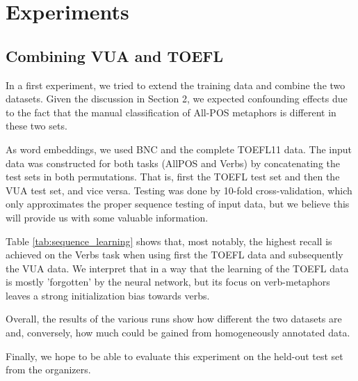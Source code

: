 \documentclass[11pt,a4paper]{article}
\begin{document}
\section{Experiments}

\subsection{Combining VUA and TOEFL}
In a first experiment, we tried to extend the training data and combine the two datasets. 
Given the discussion in Section 2, we expected confounding effects due to the fact that the manual classification of All-POS metaphors is different in these two sets. 

As word embeddings, we used BNC and the complete TOEFL11 data.
The input data was constructed for both tasks (AllPOS and Verbs) by concatenating the test sets in both permutations. That is, first the TOEFL test set and then the VUA test set, and vice versa.
Testing was done by 10-fold cross-validation, which only approximates the proper sequence testing of input data, but we believe this will provide us with some valuable information.

Table \ref{tab:sequence_learning} shows that, most notably, the highest recall is achieved on the Verbs task when using first the TOEFL data and subsequently the VUA data. We interpret that in a way that the learning of the TOEFL data is mostly 'forgotten' by the neural network, but its focus on verb-metaphors leaves a strong initialization bias towards verbs. 

Overall, the results of the various runs show how different the two datasets are and, conversely, how much could be gained from homogeneously annotated data. 

Finally, we hope to be able to evaluate this experiment on the held-out test set from the organizers.
\end{document}
